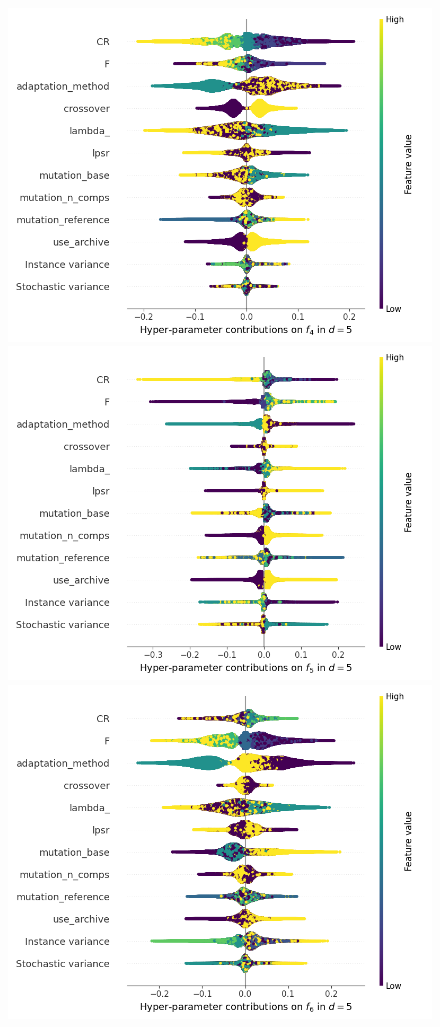 \begin{figure}[t]
	\includegraphics[height=0.15\textheight,trim=60mm 0mm 0mm 0mm,clip]{de_img_new/img_summary_f4_d5.png}
	\includegraphics[height=0.15\textheight,trim=0mm 0mm 30mm 0mm,clip]{de_img_new/img_summary_f5_d5.png}
	\includegraphics[height=0.15\textheight,trim=60mm 0mm 30mm 0mm,clip]{de_img_new/img_summary_f6_d5.png}

\end{figure}
